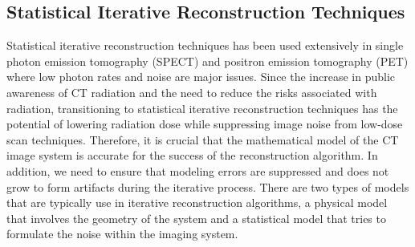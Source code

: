 \subsection{Statistical Iterative Reconstruction Techniques}
Statistical iterative reconstruction techniques has been used extensively in single photon emission tomography (SPECT) and positron emission tomography (PET) where low photon rates and noise are major issues.  Since the increase in public awareness of CT radiation and the need to reduce the risks associated with radiation, transitioning to statistical iterative reconstruction techniques has the potential of lowering radiation dose while suppressing image noise from low-dose scan techniques.  Therefore, it is crucial that the mathematical model of the CT image system is accurate for the success of the reconstruction algorithm.  In addition, we need to ensure that modeling errors are suppressed and does not grow to form artifacts during the iterative process.  There are two types of models that are typically use in iterative reconstruction algorithms, a physical model that involves the geometry of the system and a statistical model that tries to formulate the noise within the imaging system.


